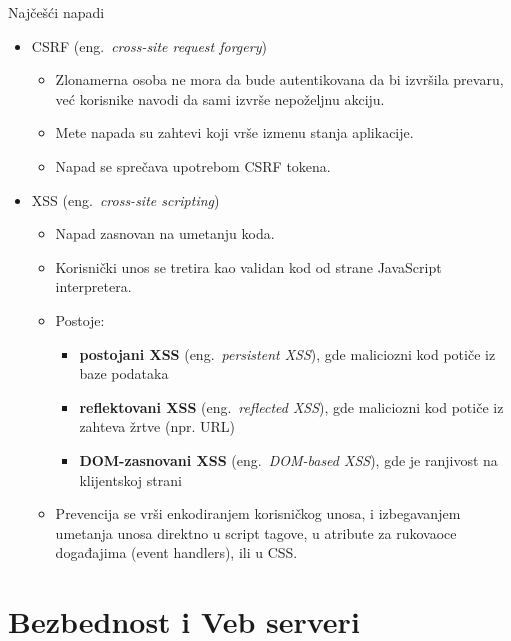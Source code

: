 \documentclass{beamer}
\begin{document}
\begin{frame}{Najčešći napadi}
    \begin{itemize}
        \item CSRF (eng.~{\em cross-site request forgery})
        \begin{itemize}
            \item Zlonamerna osoba ne mora da bude autentikovana da bi izvršila prevaru, već korisnike navodi da sami izvrše nepoželjnu akciju. \pause
            \item Mete napada su zahtevi koji vrše izmenu stanja aplikacije. \pause
            \item Napad se sprečava upotrebom CSRF tokena. \pause
        \end{itemize}
        \item XSS (eng.~{\em cross-site scripting})
        \begin{itemize}
            \item Napad zasnovan na umetanju koda. \pause
            \item Korisnički unos se tretira kao validan kod od strane JavaScript interpretera. \pause
            \item Postoje:
            \begin{itemize}
                \item \textbf{postojani XSS} (eng.~{\em persistent XSS}), gde maliciozni kod potiče iz baze podataka \pause
                \item \textbf{reflektovani XSS} (eng.~{\em reflected XSS}), gde maliciozni kod potiče iz zahteva žrtve (npr. URL) \pause
                \item \textbf{DOM-zasnovani XSS} (eng.~{\em DOM-based XSS}), gde je ranjivost na klijentskoj strani \pause
            \end{itemize}
            \item Prevencija se vrši enkodiranjem korisničkog unosa, i izbegavanjem umetanja unosa direktno u script tagove, u atribute za rukovaoce događajima (event handlers), ili u CSS.
        \end{itemize}
    \end{itemize}
\end{frame}

\section{Bezbednost i Veb serveri}
\end{document}
